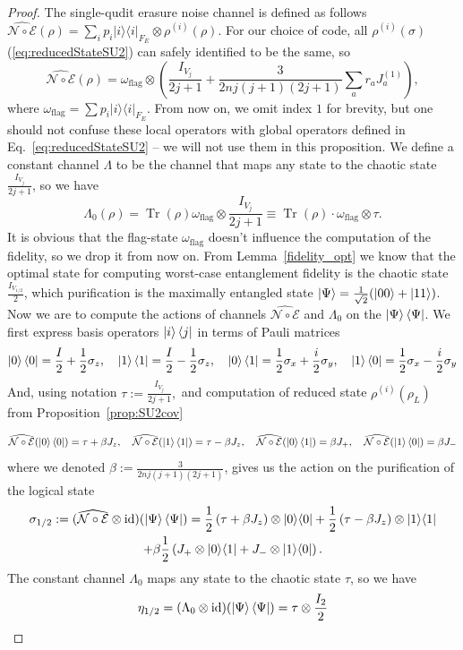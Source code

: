 \documentclass[11pt,letterpaper]{article}
\theoremstyle{plain}
\theoremstyle{plain}
\theoremstyle{plain}
\theoremstyle{plain}
\theoremstyle{plain}
\theoremstyle{plain}
\theoremstyle{plain}
\theoremstyle{definition}
\theoremstyle{plain}
\begin{document}
\begin{proof}
The single-qudit erasure noise channel is defined as follows
$
    \widehat{\mathcal{N} \circ \mathcal{E}}(\rho)=\sum_i p_i|i\rangle\langle i|_{F_E} \otimes \rho^{(i)}(\rho) .
$
For our choice of code, all $\rho^{(i)}(\sigma)$ (\ref{eq:reducedStateSU2}) can safely identified to be the same, so
$$
\widehat{\mathcal{N} \circ \mathcal{E}}(\rho)=\omega_{\text{flag}} \otimes \left(\frac{I_{V_j}}{2 j+1}+\frac{3}{2 n j(j+1)(2 j+1)} \sum_a r_a J_a^{(1)}\right),
$$
where
$
\omega_{\text{flag}}=\sum p_i|i\rangle\langle i|_{F_E}.$ From now on, we omit index $1$ for brevity, 
but one should not confuse these local operators with global operators defined in Eq.~\eqref{eq:reducedStateSU2} -- we will not use them in this proposition. 
We define a constant channel $\Lambda$ to be the channel that maps any state to the chaotic state $\frac{I_{V_j}}{2 j+1}$, so we have
\[
    \Lambda_0(\rho)=\operatorname{Tr}(\rho)\omega_{\text{flag}}\otimes \frac{I_{V_j}}{2 j+1} \equiv \operatorname{Tr}(\rho)\cdot\omega_{\text{flag}}\otimes\tau.
\]
It is obvious that the flag-state $\omega_{\text{flag}}$ doesn't influence the computation of the fidelity, so we drop it from now on. 
From Lemma~\ref{fidelity_opt} we know that the optimal state for computing worst-case entanglement fidelity is the chaotic state $\frac{I_{{V_{1/2}}}}{2}$, 
which purification is the maximally entangled state $\ket{\Psi}=\frac{1}{\sqrt{2}}(|00\rangle+|11\rangle)$. 
Now we are to compute the actions of channels $\widehat{\mathcal{N} \circ \mathcal{E}}$ and $\Lambda_0$ on the $\ket{\Psi}\bra{\Psi}$. 
We first express basis operators $\ket{i}\bra{j}$ in terms of Pauli matrices
\[
    \ket{0}\bra{0}=\frac{I}{2} + \frac{1}{2} \sigma_z, \quad \ket{1}\bra{1}=\frac{I}{2} - \frac{1}{2} \sigma_z, \quad \ket{0}\bra{1}=\frac{1}{2} \sigma_x + \frac{i}{2} \sigma_y, \quad \ket{1}\bra{0}=\frac{1}{2} \sigma_x - \frac{i}{2} \sigma_y
\]
And, using notation $\tau:=\frac{I_{V_j}}{2j+1},$ and computation of reduced state $\rho^{(i)}\left(\rho_L\right)$ from Proposition~\ref{prop:SU2cov}

\[
    \widehat{\mathcal{N} \circ \mathcal{E}}(\ket{0}\bra{0})=\tau+\beta J_z, \quad \widehat{\mathcal{N} \circ \mathcal{E}}(\ket{1}\bra{1})=\tau-\beta J_z, \quad \widehat{\mathcal{N} \circ \mathcal{E}}(\ket{0}\bra{1})=\beta J_+, \quad \widehat{\mathcal{N} \circ \mathcal{E}}(\ket{1}\bra{0})=\beta J_-
\]
where we denoted $\beta:=\frac{3}{2 n j(j+1)(2 j+1)}$, gives us the action on the purification of the logical state
\[
    \begin{gathered}
    \sigma_{1/2}:=(\widehat{\mathcal{N} \circ \mathcal{E}} \otimes \mathrm{id})(\ket{\Psi}\bra{\Psi})=\frac{1}{2}\left(\tau+\beta J_z\right) \otimes|0\rangle\langle 0|+\frac{1}{2}\left(\tau-\beta J_z\right) \otimes|1\rangle\langle 1| \\
    +\beta \frac{1}{2}\left(J_{+} \otimes|0\rangle\langle 1|+J_{-} \otimes|1\rangle\langle 0|\right) .
    \end{gathered}
\]
The constant channel $\Lambda_0$ maps any state to the chaotic state $\tau$, so we have
\[
    \eta_{1/2}=(\Lambda_0 \otimes \mathrm{id})(\ket{\Psi}\bra{\Psi})=\tau \otimes \frac{I_2}{2}
\]


\end{proof}
\end{document}
